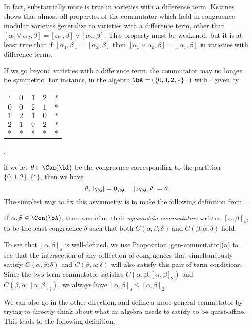 In fact, substantially more is true in varieties with a difference term. Kearnes \cite{kearnes-difference} shows that almost all properties of the commutator which hold in congruence modular varieties generalize to varieties with a difference term, other than $[\alpha_1 \vee \alpha_2,\beta] = [\alpha_1,\beta] \vee [\alpha_2,\beta]$. This property must be weakened, but it is at least true that if $[\alpha_1,\beta] = [\alpha_2,\beta]$ then $[\alpha_1\vee\alpha_2,\beta] = [\alpha_1,\beta]$ in varieties with difference terms.

If we go beyond varieties with a difference term, the commutator may no longer be symmetric. For instance, in the algebra $\bA = (\{0,1,2,*\},\cdot)$ with $\cdot$ given by
\begin{center}
\begin{tabular}{c|cccc} $\cdot$ & $0$ & $1$ & $2$ & $*$\\ \hline $0$ & $0$ & $2$ & $1$ & $*$\\ $1$ & $2$ & $1$ & $0$ & $*$\\ $2$ & $1$ & $0$ & $2$ & $*$\\ $*$ & $*$ & $*$ & $*$ & $*$\end{tabular},
\end{center}
if we let $\theta \in \Con(\bA)$ be the congruence corresponding to the partition $\{0,1,2\},\{*\}$, then we have
\[
[\theta,1_\bA] = 0_\bA, \;\;\; [1_\bA,\theta] = \theta.
\]
The simplest way to fix this asymmetry is to make the following definition from \cite{kearnes-taylor-affine}.

\begin{defn} If $\alpha, \beta \in \Con(\bA)$, then we define their \emph{symmetric commutator}, written $[\alpha,\beta]_s$, to be the least congruence $\delta$ such that both $C(\alpha,\beta;\delta)$ and $C(\beta,\alpha;\delta)$ hold.
\end{defn}

To see that $[\alpha,\beta]_s$ is well-defined, we use Proposition \ref{gen-commutator}(a) to see that the intersection of any collection of congruences that simultaneously satisfy $C(\alpha,\beta;\delta)$ and $C(\beta,\alpha;\delta)$ will also satisfy this pair of term conditions. Since the two-term commutator satisfies $C(\alpha,\beta;[\alpha,\beta]_2)$ and $C(\beta,\alpha;[\alpha,\beta]_2)$, we always have $[\alpha,\beta]_s \le [\alpha,\beta]_2$.

We can also go in the other direction, and define a more general commutator by trying to directly think about what an algebra needs to satisfy to be quasi-affine. This leads to the following definition.

